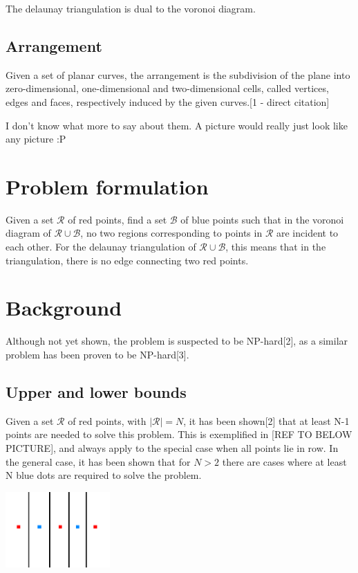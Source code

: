 \documentclass[a4paper,12pt]{article}
\begin{document}
The delaunay triangulation is dual to the voronoi diagram.


\subsection{Arrangement}
Given a set of planar curves, the arrangement is the subdivision of the plane into zero-dimensional, one-dimensional and two-dimensional cells, called vertices, edges and faces, respectively induced by the given curves.[1 - direct citation]

I don't know what more to say about them. A picture would really just look like any picture :P

\section{Problem formulation}
Given a set $\mathcal{R}$ of red points, find a set $\mathcal{B}$ of blue points such that in the voronoi diagram of $\mathcal{R} \cup \mathcal{B}$, no two regions corresponding to points in $\mathcal{R}$ are incident to each other. For the delaunay triangulation of $\mathcal{R} \cup \mathcal{B}$, this means that in the triangulation, there is no edge connecting two red points.


\section{Background}
Although not yet shown, the problem is suspected to be NP-hard[2], as a similar problem has been proven to be NP-hard[3].
\subsection{Upper and lower bounds}
Given a set $\mathcal{R}$ of red points, with $|\mathcal{R}| = N$, it has been shown[2] that at least N-1 points are needed to solve this problem. This is exemplified in [REF TO BELOW PICTURE], and always apply to the special case when all points lie in row. In the general case, it has been shown that for $N>2$ there are cases where at least N blue dots are required to solve the problem.

\includegraphics[width=0.3\textwidth]{pictures/N-1solution.png}
\end{document}
